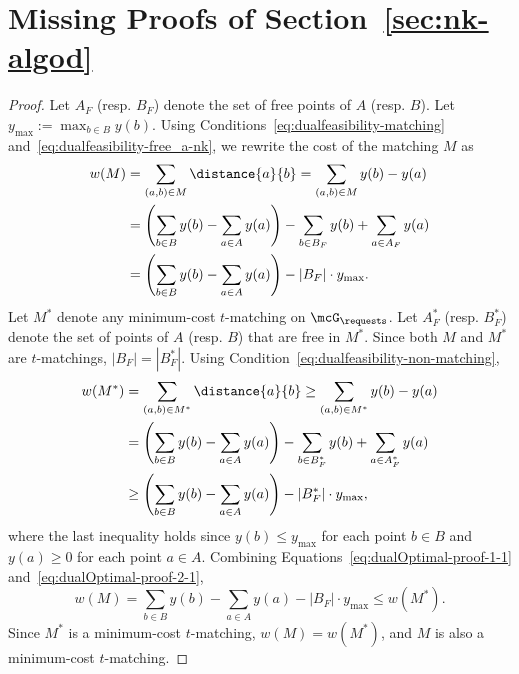 \section{Missing Proofs of Section~\ref{sec:nk-algod}}
\label{sec:nk-algo-appendix}


\partialoptimaltime*
\begin{proof}
Let $A_F$ (resp. $B_F$) denote the set of free points of $A$ (resp. $B$). Let $y_{\max}:=\max_{b\in B}y(b)$. 
Using Conditions~\eqref{eq:dualfeasibility-matching} and~\eqref{eq:dualfeasibility-free_a-nk}, we rewrite the cost of the matching $M$ as
\begin{align}
    w(M) &= \sum_{(a,b)\in M} \distance{a}{b} = \sum_{(a,b)\in M} y(b) - y(a)\nonumber \\ &= \left(\sum_{b\in B} y(b) - \sum_{a\in A} y(a)\right) - \sum_{b\in B_F} y(b) + \sum_{a\in A_F} y(a)\nonumber \\ &= \left(\sum_{b\in B} y(b) - \sum_{a\in A} y(a)\right) - |B_F|\cdot y_{\max}.
    \label{eq:dualOptimal-proof-1-1}
\end{align}
Let $M^*$ denote any minimum-cost $t$-matching on $\mcG_\requests$. Let $A^*_F$ (resp. $B^*_F$) denote the set of points of $A$ (resp. $B$) that are free in $M^*$. Since both $M$ and $M^*$ are $t$-matchings, $|B_F|=|B^*_F|$. Using Condition~\eqref{eq:dualfeasibility-non-matching},
\begin{align}
    w(M^*) &= \sum_{(a,b)\in M^*} \distance{a}{b} \ge \sum_{(a,b)\in M^*} y(b) - y(a)\nonumber \\ &= \left(\sum_{b\in B} y(b) - \sum_{a\in A} y(a)\right) - \sum_{b\in B^*_F} y(b) + \sum_{a\in A^*_F} y(a)\nonumber \\ &\ge \left(\sum_{b\in B} y(b) - \sum_{a\in A} y(a)\right) -  |B^*_F|\cdot y_{\max},
    \label{eq:dualOptimal-proof-2-1}
\end{align}
where the last inequality holds since $y(b)\le y_{\max}$ for each point $b\in B$ and $y(a)\ge 0$ for each point $a\in A$. Combining Equations~\eqref{eq:dualOptimal-proof-1-1} and~\eqref{eq:dualOptimal-proof-2-1},
\[w(M) = \sum_{b\in B} y(b) - \sum_{a\in A} y(a) - |B_F|\cdot y_{\max} \le w(M^*). \]
Since $M^*$ is a minimum-cost $t$-matching, $w(M)=w(M^*)$, and $M$ is also a minimum-cost $t$-matching.
\end{proof}




